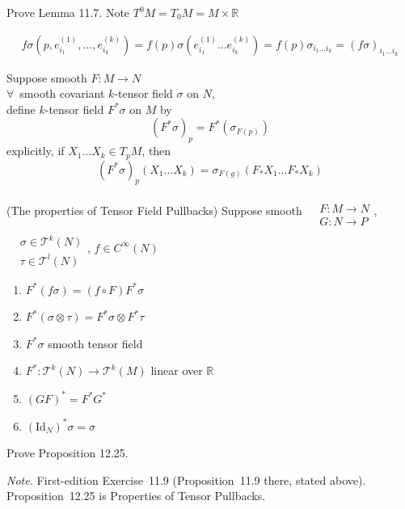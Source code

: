 Prove Lemma 11.7.  Note $T^0M = T_0M = M \times \mathbb{R}$

\[
\begin{gathered}
  f\sigma( p, e^{(1)}_{i_1} , \dots , e^{(k)}_{i_k} ) = f(p) \sigma( e^{(1)}_{i_1} \dots e^{(k)}_{i_k} ) = f(p) \sigma_{i_1 \dots i_k} = (f\sigma)_{i_1 \dots i_k}
\end{gathered}
\]


Suppose smooth $F:M \to N$ \\
$\forall \, $ smooth covariant $k$-tensor field $\sigma$ on $N$, \\
define $k$-tensor field $F^*\sigma$ on $M$ by 
\[
(F^* \sigma)_p = F^*(\sigma_{F(p)})
\]
explicitly, if $X_1 \dots X_k \in T_pM$, then
\[
(F^* \sigma)_p(X_1 \dots X_k) = \sigma_{F(g)}(F_* X_1 \dots F_* X_k)
\]


\begin{proposition}[11.9] (The properties of Tensor Field Pullbacks)
Suppose smooth $\begin{aligned} & \quad \\ 
  & F:M \to N \\
  & G:N \to P \end{aligned}$, \quad $\begin{aligned} & \quad \\ 
  & \sigma \in \mathcal{T}^k(N) \\ 
  & \tau \in \mathcal{T}^l(N) \end{aligned}$, \quad $f\in C^{\infty}(N)$ 
\begin{enumerate}
  \item[(a)] $F^*(f\sigma) = (f\circ F) F^* \sigma$
\item[(b)] $F^*(\sigma \otimes \tau) = F^*\sigma \otimes F^*\tau$ 
\item[(c)] $F^*\sigma$ smooth tensor field 
\item[(d)] $F^*:\mathcal{T}^k(N) \to \mathcal{T}^k(M)$ linear over $\mathbb{R}$
\item[(e)] $(GF)^* = F^* G^*$ 
\item[(f)] $(\text{Id}_N)^*\sigma = \sigma$
\end{enumerate}
\end{proposition}

\begin{exercise}
Prove Proposition 12.25.
\end{exercise}
\noindent\emph{Note.} First-edition Exercise~11.9 (Proposition~11.9 there, stated above). Proposition~12.25 is Properties of Tensor Pullbacks.
